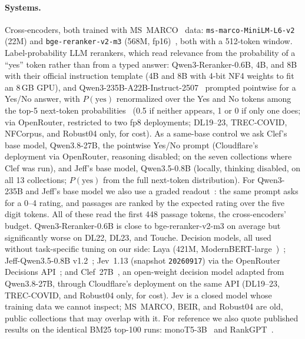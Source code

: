 \paragraph{Systems.}
Cross-encoders, both trained with MS~MARCO~\cite{bajaj2016msmarco} data: \texttt{ms-marco-MiniLM-L6-v2} (22M) and \texttt{bge-reranker-v2-m3} (568M, fp16)~\cite{bgererankerv2m3,chen2024bgem3}, both with a 512-token window.
Label-probability LLM rerankers, which read relevance from the probability of a ``yes'' token rather than from a typed answer: Qwen3-Reranker-0.6B, 4B, and 8B~\cite{qwen3embedding} with their official instruction template (4B and 8B with 4-bit NF4 weights to fit an 8\,GB GPU), and Qwen3-235B-A22B-Instruct-2507~\cite{qwen3} prompted pointwise for a Yes/No answer, with $P(\text{yes})$ renormalized over the Yes and No tokens among the top-5 next-token probabilities~\cite{zhuang2023beyond} (0.5 if neither appears, 1 or 0 if only one does; via OpenRouter, restricted to two fp8 deployments; DL19--23, TREC-COVID, NFCorpus, and Robust04 only, for cost).
As a same-base control we ask Clef's base model, Qwen3.8-27B, the pointwise Yes/No prompt (Cloudflare's deployment via OpenRouter, reasoning disabled; on the seven collections where Clef was run), and Jeff\kern0pt's base model, Qwen3.5-0.8B (locally, thinking disabled, on all 13 collections; $P(\text{yes})$ from the full next-token distribution).
For Qwen3-235B and Jeff's base model we also use a graded readout~\cite{zhuang2023beyond}: the same prompt asks for a 0--4 rating, and passages are ranked by the expected rating over the five digit tokens. All of these read the first 448 passage tokens, the cross-encoders' budget. Qwen3-Reranker-0.6B is close to bge-reranker-v2-m3 on average but significantly worse on DL22, DL23, and Touche.
Decision models, all used without task-specific tuning on our side: Laya (421M, ModernBERT-large~\cite{warner2024modernbert})~\cite{laya}; Jeff-Qwen3.5-0.8B v1.2~\cite{jeff}; Jev~1.13 (snapshot \texttt{20260917}) via the OpenRouter Decisions API~\cite{jev}; and Clef~27B~\cite{clef}, an open-weight decision model adapted from Qwen3.8-27B, through Cloudflare's deployment on the same API (DL19--23, TREC-COVID, and Robust04 only, for cost).
Jev is a closed model whose training data we cannot inspect; MS~MARCO, BEIR, and Robust04 are old, public collections that may overlap with it.
For reference we also quote published results on the identical BM25 top-100 runs: monoT5-3B~\cite{nogueira2020monot5} and RankGPT~\cite{sun2023rankgpt}.

